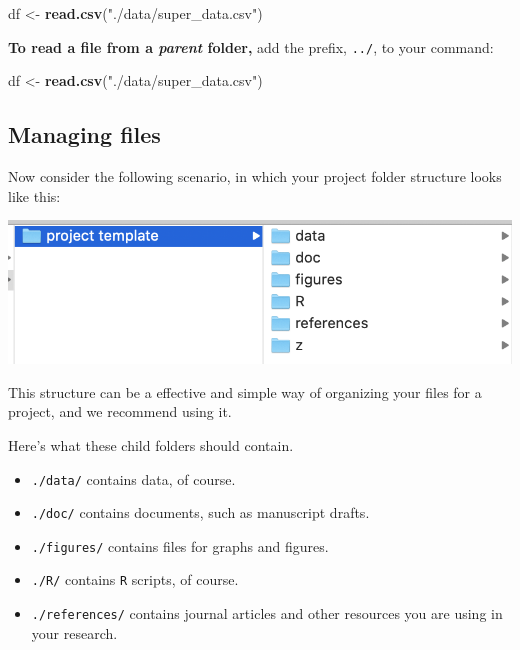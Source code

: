 \documentclass[
]{book}
\newenvironment{Shaded}{\begin{snugshade}}{\end{snugshade}}
\newcommand{\KeywordTok}[1]{\textcolor[rgb]{0.13,0.29,0.53}{\textbf{#1}}}
\newcommand{\NormalTok}[1]{#1}
\newcommand{\StringTok}[1]{\textcolor[rgb]{0.31,0.60,0.02}{#1}}
\providecommand{\tightlist}{%
  \setlength{\itemsep}{0pt}\setlength{\parskip}{0pt}}
\begin{document}
\begin{Shaded}
\begin{Highlighting}[]
\NormalTok{df <-}\StringTok{ }\KeywordTok{read.csv}\NormalTok{(}\StringTok{"./data/super_data.csv"}\NormalTok{)}
\end{Highlighting}
\end{Shaded}

\textbf{To read a file from a \emph{parent} folder,} add the prefix, \texttt{../}, to your command:

\begin{Shaded}
\begin{Highlighting}[]
\NormalTok{df <-}\StringTok{ }\KeywordTok{read.csv}\NormalTok{(}\StringTok{"./data/super_data.csv"}\NormalTok{)}
\end{Highlighting}
\end{Shaded}

\hypertarget{managing-files}{%
\subsection*{Managing files}\label{managing-files}}

Now consider the following scenario, in which your project folder structure looks like this:

\includegraphics{img/project_template.png}

This structure can be a effective and simple way of organizing your files for a project, and we recommend using it.

Here's what these child folders should contain.

\begin{itemize}
\tightlist
\item
  \texttt{./data/} contains data, of course.
\item
  \texttt{./doc/} contains documents, such as manuscript drafts.
\item
  \texttt{./figures/} contains files for graphs and figures.
\item
  \texttt{./R/} contains \texttt{R} scripts, of course.
\item
  \texttt{./references/} contains journal articles and other resources you are using in your research.
\end{itemize}
\end{document}
